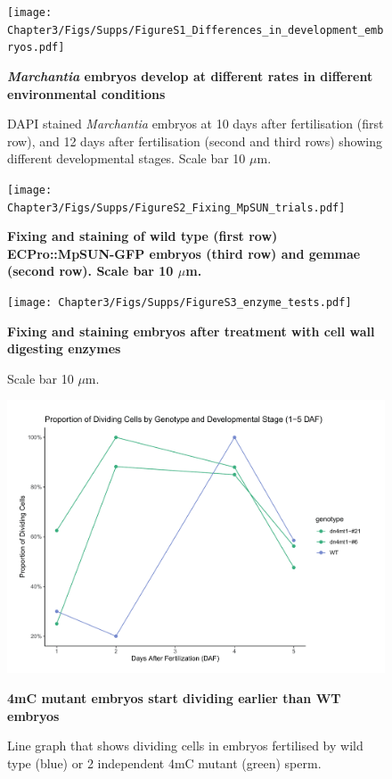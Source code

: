 
\begin{figure}[htbp!] 
\centering    
    \texttt{[image: Chapter3/Figs/Supps/FigureS1\_Differences\_in\_development\_embryos.pdf]}
\caption{\textbf{\textit{Marchantia} embryos develop at different rates in different environmental conditions}}
\label{fig:embryo_diff}
\captionsetup{font=small}
    \caption*{DAPI stained \textit{Marchantia} embryos at 10 days after fertilisation (first row), and 12 days after fertilisation (second and third rows) showing different developmental stages. Scale bar 10 $\mu$m.}
\end{figure}

\begin{figure}[htbp!] 
\centering    
    \texttt{[image: Chapter3/Figs/Supps/FigureS2\_Fixing\_MpSUN\_trials.pdf]}
\caption{\textbf{Fixing and staining of wild type (first row) ECPro::MpSUN-GFP embryos (third row) and gemmae (second row). Scale bar 10 $\mu$m.}}
\label{fig:MpSUN}
\captionsetup{font=small}
    \caption*{}
\end{figure}

\begin{figure}[htbp!] 
\centering    
    \texttt{[image: Chapter3/Figs/Supps/FigureS3\_enzyme\_tests.pdf]}
\caption{\textbf{Fixing and staining embryos after treatment with cell wall digesting enzymes}}
\label{fig:enzyme_tests}
\captionsetup{font=small}
    \caption*{Scale bar 10 $\mu$m.}
\end{figure}

\begin{figure}[htbp!] 
\centering    
    \includegraphics[width=1\textwidth]{Chapter3/Figs/Supps/FigureS4_dividing_cells.pdf}
\caption{\textbf{4mC mutant embryos start dividing earlier than WT embryos}}
\label{fig:Dividing_cells}
\captionsetup{font=small}
    \caption*{Line graph that shows dividing cells in embryos fertilised by wild type (blue) or 2 independent 4mC mutant (green) sperm.}
\end{figure}


